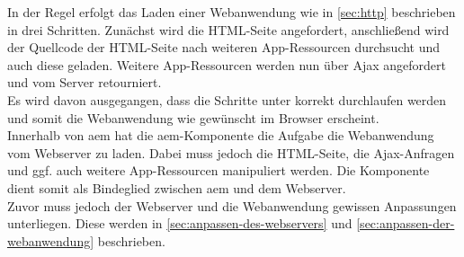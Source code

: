 
In der Regel erfolgt das Laden einer Webanwendung wie in \autoref{sec:http} beschrieben in drei Schritten. Zunächst wird die HTML-Seite angefordert, anschließend wird der Quellcode der HTML-Seite nach weiteren App-Ressourcen durchsucht und auch diese geladen. Weitere App-Ressourcen werden nun über Ajax angefordert und vom Server retourniert. \\
Es wird davon ausgegangen, dass die Schritte unter \serverB korrekt durchlaufen werden und somit die Webanwendung wie gewünscht im Browser erscheint. \\
Innerhalb von \ac{aem} hat die \ac{aem}-Komponente die Aufgabe die Webanwendung vom Webserver zu laden. Dabei muss jedoch die HTML-Seite, die Ajax-Anfragen und ggf. auch weitere App-Ressourcen manipuliert werden. Die Komponente dient somit als Bindeglied zwischen \ac{aem} und dem Webserver.\\
Zuvor muss jedoch der Webserver und die Webanwendung gewissen Anpassungen unterliegen. Diese werden in \autoref{sec:anpassen-des-webservers} und \autoref{sec:anpassen-der-webanwendung} beschrieben.
